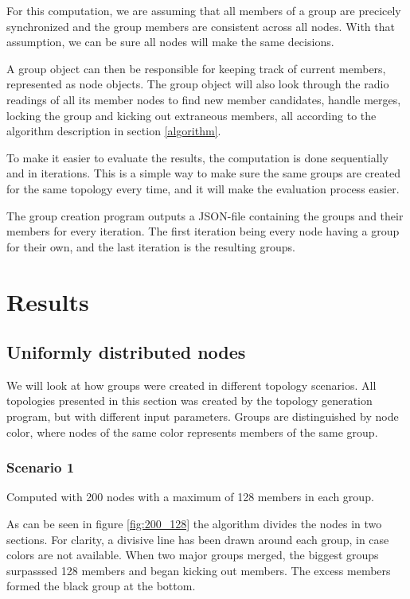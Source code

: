 \documentclass[a4paper,UKenglish]{report}
\begin{document}
For this computation, we are assuming that all members of a group are precicely synchronized
and the group members are consistent across all nodes. With that assumption, we can be sure
all nodes will make the same decisions. 

A group object can then be responsible for keeping track of current members,
represented as node objects. The group object will also look through the radio readings
of all its member nodes to find new member candidates, handle merges, locking the group and
kicking out extraneous members, all according to the algorithm description in section
\ref{algorithm}.
   

To make it easier to evaluate the results, the computation is done sequentially
and in iterations. This is a simple way to make sure the same groups are created
for the same topology every time, and it will make the evaluation process easier. 

The group creation program outputs a JSON-file containing the groups and their members for every iteration. The first iteration being every node having a group for their own,
and the last iteration is the resulting groups.
\section{Results}
\subsection{Uniformly distributed nodes}
We will look at how groups were created in different topology scenarios. 
All topologies presented in this section was created by the topology generation program,
but with different input parameters. Groups are distinguished by node color, where nodes
of the same color represents members of the same group. 
\subsubsection{Scenario 1}
Computed with 200 nodes with a maximum of 128 members in each group.

As can be seen in figure \ref{fig:200_128} the algorithm divides the nodes in two
sections. For clarity, a divisive line has been drawn around each group,
in case colors are not available.
When two major groups merged, the biggest groups surpasssed 128 members and began
kicking out members. The excess members formed the black group at the bottom. 
\end{document}
